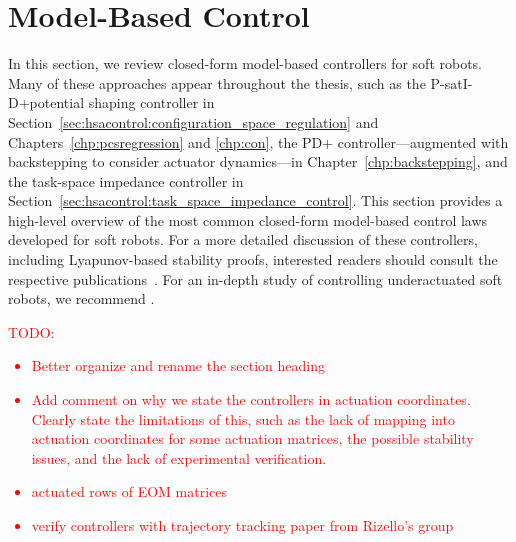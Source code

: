 \section{Model-Based Control}\label{sec:background:model_based_control}
In this section, we review closed-form model-based controllers for soft robots. Many of these approaches appear throughout the thesis, such as the P-satI-D+potential shaping controller in Section~\ref{sec:hsacontrol:configuration_space_regulation} and Chapters~\ref{chp:pcsregression} and \ref{chp:con}, the PD+ controller—augmented with backstepping to consider actuator dynamics—in Chapter~\ref{chp:backstepping}, and the task-space impedance controller in Section~\ref{sec:hsacontrol:task_space_impedance_control}. This section provides a high-level overview of the most common closed-form model-based control laws developed for soft robots. For a more detailed discussion of these controllers, including Lyapunov-based stability proofs, interested readers should consult the respective publications~\citep{della2020model, pustina2022feedback, pustina2022p, borja2022energy, della2023model}. For an in-depth study of controlling underactuated soft robots, we recommend \citet{pustina2025analysis}.

\textcolor{red}{TODO: \begin{itemize}
    \item Better organize and rename the section heading
    \item Add comment on why we state the controllers in actuation coordinates. Clearly state the limitations of this, such as the lack of mapping into actuation coordinates for some actuation matrices, the possible stability issues, and the lack of experimental verification.
    \item actuated rows of EOM matrices
    \item verify controllers with trajectory tracking paper from Rizello's group
\end{itemize}}

